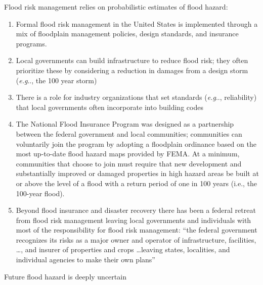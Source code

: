\documentclass[11pt]{article}
\makeatletter
\DeclareRobustCommand\onedot{\futurelet\@let@token\@onedot}
\def\@onedot{\ifx\@let@token.\else.\null\fi\xspace}
\def\eg{\emph{e.g}\onedot} \def\Eg{\emph{E.g}\onedot}
\DeclareRobustCommand\onedot{\futurelet\@let@token\@onedot}
\def\@onedot{\ifx\@let@token.\else.\null\fi\xspace}
\def\eg{\emph{e.g}\onedot} \def\Eg{\emph{E.g}\onedot}
\makeatother
\begin{document}
Flood risk management relies on probabilistic estimates of flood hazard:
\begin{enumerate}
    \item Formal flood risk management in the United States is implemented through a mix of floodplain management policies, design standards, and insurance programs.
    \item Local governments can build infrastructure to reduce flood risk; they often prioritize these by considering a reduction in damages from a design storm (\eg, the 100 year storm) \citep{hcfcd_prioritization:2019}
    \item There is a role for industry organizations that set standards (\eg, reliability) that local governments often incorporate into building codes \citep{asce_infrastructure_climate:2021}
    \item The National Flood Insurance Program was designed as a partnership between the federal government and local communities; communities can voluntarily join the program by adopting a floodplain ordinance based on the most up-to-date flood hazard maps provided by FEMA. At a minimum, communities that choose to join must require that new development and substantially improved or damaged properties in high hazard areas be built at or above the level of a flood with a return period of one in 100 years (i.e., the 100-year flood). \citep{kousky_voucher:2014}
    \item Beyond flood insurance and disaster recovery there has been a federal retreat from flood risk management leaving local governments and individuals with most of the responsibility for flood risk management: ``the federal government recognizes its risks as a major owner and operator of infrastructure, facilities, \ldots, and insurer of properties and crops \ldots leaving states, localities, and individual agencies to make their own plans'' \citep{shi_transformative:2021}
\end{enumerate}
Future flood hazard is deeply uncertain
\end{document}
